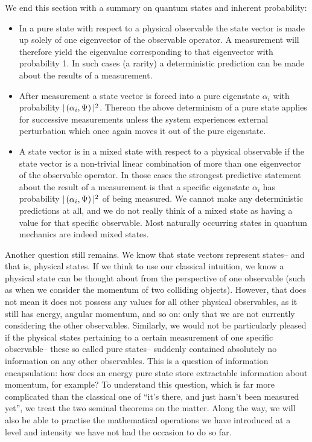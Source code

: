 We end this section with a summary on quantum states and inherent probability:
\begin{itemize}
    \item In a pure state with respect to a physical observable the state vector is made up solely of one eigenvector of the observable operator. A measurement will therefore yield the eigenvalue corresponding to that eigenvector with probability 1. In such cases (a rarity) a deterministic prediction can be made about the results of a measurement.
    \item After measurement a state vector is forced into a pure eigenstate $\alpha_{i}$ with probability $|\left(\alpha_{i},\Psi\right)|^2$. Thereon the above determinism of a pure state applies for successive measurements unless the system experiences external perturbation which once again moves it out of the pure eigenstate.
    \item A state vector is in a mixed state with respect to a physical observable if the state vector is a non-trivial linear combination of more than one eigenvector of the observable operator. In those cases the strongest predictive statement about the result of a measurement is that a specific eigenstate $\alpha_{i}$ has probability $|\left(\alpha_{i},\Psi\right)|^2$ of being measured. We cannot make any deterministic predictions at all, and we do not really think of a mixed state as having a value for that specific observable. Most naturally occurring states in quantum mechanics are indeed mixed states.
\end{itemize}
Another question still remains. We know that state vectors represent states-- and that is, physical states. If we think to use our classical intuition, we know a physical state can be thought about from the perspective of one observable (such as when we consider the momentum of two colliding objects). However, that does not mean it does not possess any values for all other physical observables, as it still has energy, angular momentum, and so on: only that we are not currently considering the other observables. Similarly, we would not be particularly pleased if the physical states pertaining to a certain measurement of one specific observable-- these so called pure states-- suddenly contained absolutely no information on any other observables. This is a question of information encapsulation: how does an energy pure state store extractable information about momentum, for example? To understand this question, which is far more complicated than the classical one of ``it's there, and just hasn't been measured yet'', we treat the two seminal theorems on the matter. Along the way, we will also be able to practise the mathematical operations we have introduced at a level and intensity we have not had the occasion to do so far.
